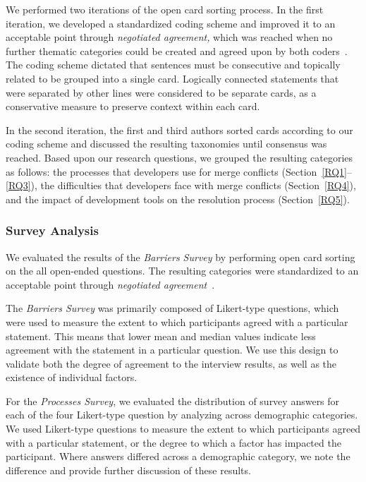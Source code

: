 We performed two iterations of the open card sorting process.
In the first iteration, we developed a standardized coding scheme and improved it to an acceptable point through \textit{negotiated agreement,} which was reached when no further thematic categories could be created and agreed upon by both coders~\cite{garrison2006revisiting,ritchie2013qualitative}.
The coding scheme dictated that sentences must be consecutive and topically related to be grouped into a single card.
Logically connected statements that were separated by other lines were considered to be separate cards, as a conservative measure to preserve context within each card.

In the second iteration, the first and third authors sorted cards according to our coding scheme and discussed the resulting taxonomies until consensus was reached.
Based upon our research questions, we grouped the resulting categories as follows: the processes that developers use for merge conflicts (Section~\ref{RQ1}--\ref{RQ3}), the difficulties that developers face with merge conflicts (Section~\ref{RQ4}), and the impact of development tools on the resolution process (Section~\ref{RQ5}).

\subsubsection{Survey Analysis}

We evaluated the results of the \textit{Barriers Survey} by performing open card sorting on the all open-ended questions.
The resulting categories were standardized to an acceptable point through \textit{negotiated agreement}~\cite{ritchie2013qualitative}.

The \textit{Barriers Survey} was primarily composed of Likert-type questions, which were used to measure the extent to which participants agreed with a particular statement.
This means that lower mean and median values indicate less agreement with the statement in a particular question.
We use this design to validate both the degree of agreement to the interview results, as well as the existence of individual factors.

For the \textit{Processes Survey}, we evaluated the distribution of survey answers for each of the four Likert-type question by analyzing across demographic categories.
We used Likert-type questions to measure the extent to which participants agreed with a particular statement, or the degree to which a factor has impacted the participant.
Where answers differed across a demographic category, we note the difference and provide further discussion of these results.

